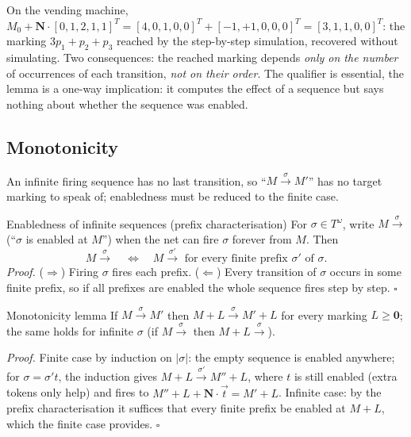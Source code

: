 On the vending machine, $M_0 + \mathbf{N} \cdot [0,1,2,1,1]^T = [4,0,1,0,0]^T + [-1,+1,0,0,0]^T = [3,1,1,0,0]^T$: the marking $3p_1 + p_2 + p_3$ reached by the step-by-step simulation, recovered without simulating. Two consequences: the reached marking depends \emph{only on the number} of occurrences of each transition, \emph{not on their order}. The qualifier is essential, the lemma is a one-way implication: it computes the effect of a sequence but says nothing about whether the sequence was enabled.

\subsection{Monotonicity}

An infinite firing sequence has no last transition, so ``$M \xrightarrow{\sigma} M'$'' has no target marking to speak of; enabledness must be reduced to the finite case.
\begin{definitionbox}{Enabledness of infinite sequences (prefix characterisation)}
For $\sigma \in T^\omega$, write $M \xrightarrow{\sigma}$ (``$\sigma$ is enabled at $M$'') when the net can fire $\sigma$ forever from $M$. Then
\[
M \xrightarrow{\sigma} \quad\Longleftrightarrow\quad M \xrightarrow{\sigma'} \text{ for every finite prefix } \sigma' \text{ of } \sigma.
\]
\textit{Proof.} ($\Rightarrow$) Firing $\sigma$ fires each prefix. ($\Leftarrow$) Every transition of $\sigma$ occurs in some finite prefix, so if all prefixes are enabled the whole sequence fires step by step. \hfill$\square$
\end{definitionbox}

\begin{definitionbox}{Monotonicity lemma}
If $M \xrightarrow{\sigma} M'$ then $M + L \xrightarrow{\sigma} M' + L$ for every marking $L \geq \mathbf{0}$; the same holds for infinite $\sigma$ (if $M \xrightarrow{\sigma}$ then $M + L \xrightarrow{\sigma}$).
\par\smallskip
\textit{Proof.} Finite case by induction on $|\sigma|$: the empty sequence is enabled anywhere; for $\sigma = \sigma' t$, the induction gives $M + L \xrightarrow{\sigma'} M'' + L$, where $t$ is still enabled (extra tokens only help) and fires to $M'' + L + \mathbf{N} \cdot \vec{t} = M' + L$. Infinite case: by the prefix characterisation it suffices that every finite prefix be enabled at $M + L$, which the finite case provides. \hfill$\square$
\end{definitionbox}

